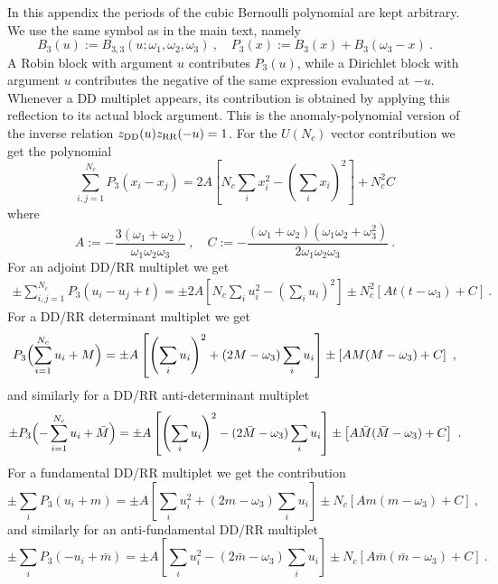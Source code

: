 \documentclass[11pt,a4paper]{article}
\numberwithin{equation}{section}
\theoremstyle{plain}
\theoremstyle{definition}
\theoremstyle{remark}
\begin{document}
In this appendix the periods of the cubic Bernoulli polynomial are kept arbitrary.  We use the same symbol as in the main text, namely
\begin{equation}
B_3(u):=B_{3,3}(u;\omega_1,\omega_2,\omega_3)~,\quad P_3(x):=B_3(x)+B_3(\omega_3-x)~.
\end{equation}
A Robin block with argument \(u\) contributes \(P_3(u)\), while a Dirichlet block with argument \(u\) contributes the negative of the same expression evaluated at \(-u\).  Whenever a DD multiplet appears, its contribution is obtained by applying this reflection to its actual block argument.  This is the anomaly-polynomial version of the inverse relation \(z_{\rm DD}(u)z_{\rm RR}(-u)=1\).
For the $U(N_c)$ vector contribution we get the polynomial
\begin{equation}
\sum_{i,j=1}^{N_c}P_3(x_i-x_j)=2A
\left[
N_c\sum_i x_i^2-\left(\sum_i x_i\right)^2
\right]
+N_c^2 C
\end{equation}
where 
\begin{equation}
A:=  -\frac{3(\omega_1+\omega_2)}
{\omega_1\omega_2\omega_3}~,\quad C:= 
-\frac{(\omega_1+\omega_2)(\omega_1\omega_2+\omega_3^2)}
{2\omega_1\omega_2\omega_3}
~.
\end{equation}
For an adjoint DD/RR multiplet we get
\begin{align}
\pm\sum_{i,j=1}^{N_c}
P_3(u_i-u_j+t)
 =
\pm 2A\left[N_c\sum_i u_i^2
-\left(\sum_i u_i\right)^2\right]
\pm
N_c^2\left[At(t-\omega_3)+C\right]~.
\end{align}
For a DD/RR determinant multiplet we get
\begin{align}
P_3\Bigl(\sum_{i=1}^{N_c}u_i+M\Bigr)=\pm A
\left[
\left(\sum_i u_i\right)^2
+(2M-\omega_3)\sum_i u_i\right]
\pm \left[AM(M-\omega_3)
+C\right]~,
\end{align}
and similarly for a DD/RR anti-determinant multiplet 
\begin{align}
\pm P_3\Bigl(-\sum_{i=1}^{N_c}u_i+\bar M\Bigr)
=\pm A
\left[
\left(\sum_i u_i\right)^2
-(2\bar M-\omega_3)\sum_i u_i\right]
\pm \left[A\bar M(\bar M-\omega_3)
+C\right]~.
\end{align}
For a fundamental DD/RR multiplet we get the contribution
\begin{equation}
\pm\sum_i P_3(u_i+m)
=
\pm A\left[\sum_i u_i^2
+
(2m-\omega_3)\sum_i u_i\right]\pm N_c\left[Am(m-\omega_3)+C\right]~,
\end{equation}
and similarly for an anti-fundamental DD/RR multiplet
\begin{equation}
\pm\sum_i P_3(-u_i+\bar m)
=
\pm A\left[\sum_i u_i^2
-(2\bar m-\omega_3)\sum_i u_i\right]\pm N_c\left[A\bar m(\bar m-\omega_3)+C\right]~.
\end{equation}
\end{document}
